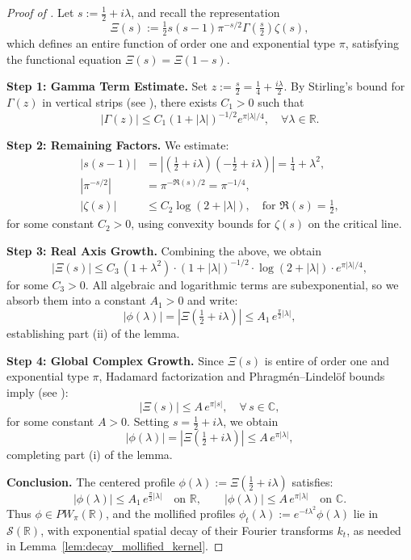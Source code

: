 \begin{proof}[Proof of ]
Let \( s := \tfrac{1}{2} + i\lambda \), and recall the representation
\[
\Xi(s) := \tfrac{1}{2}s(s-1)\pi^{-s/2} \Gamma\left( \tfrac{s}{2} \right) \zeta(s),
\]
which defines an entire function of order one and exponential type \( \pi \), satisfying the functional equation \( \Xi(s) = \Xi(1 - s) \).

\medskip
\noindent\textbf{Step 1: Gamma Term Estimate.}
Set \( z := \tfrac{s}{2} = \tfrac{1}{4} + \tfrac{i\lambda}{2} \). By Stirling’s bound for \( \Gamma(z) \) in vertical strips (see \cite[Eq.~(1.5.3)]{Titchmarsh1986Zeta}), there exists \( C_1 > 0 \) such that
\[
|\Gamma(z)| \le C_1 (1 + |\lambda|)^{-1/2} e^{\pi |\lambda| / 4}, \quad \forall \lambda \in \mathbb{R}.
\]

\medskip
\noindent\textbf{Step 2: Remaining Factors.}
We estimate:
\begin{align*}
|s(s - 1)| &= \left| \left( \tfrac{1}{2} + i\lambda \right)\left( -\tfrac{1}{2} + i\lambda \right) \right| = \tfrac{1}{4} + \lambda^2, \\
|\pi^{-s/2}| &= \pi^{-\Re(s)/2} = \pi^{-1/4}, \\
|\zeta(s)| &\le C_2 \log(2 + |\lambda|), \quad \text{for } \Re(s) = \tfrac{1}{2},
\end{align*}
for some constant \( C_2 > 0 \), using convexity bounds for \( \zeta(s) \) on the critical line.

\medskip
\noindent\textbf{Step 3: Real Axis Growth.}
Combining the above, we obtain
\[
|\Xi(s)| \le C_3\, (1 + \lambda^2) \cdot (1 + |\lambda|)^{-1/2} \cdot \log(2 + |\lambda|) \cdot e^{\pi |\lambda| / 4},
\]
for some \( C_3 > 0 \). All algebraic and logarithmic terms are subexponential, so we absorb them into a constant \( A_1 > 0 \) and write:
\[
|\phi(\lambda)| = |\Xi(\tfrac{1}{2} + i\lambda)| \le A_1\, e^{\tfrac{\pi}{2} |\lambda|},
\]
establishing part (ii) of the lemma.

\medskip
\noindent\textbf{Step 4: Global Complex Growth.}
Since \( \Xi(s) \) is entire of order one and exponential type \( \pi \), Hadamard factorization and Phragmén–Lindelöf bounds imply (see \cite[Ch.~3]{Levin1996EntireLectures}):
\[
|\Xi(s)| \le A\, e^{\pi |s|}, \quad \forall\, s \in \mathbb{C},
\]
for some constant \( A > 0 \). Setting \( s = \tfrac{1}{2} + i\lambda \), we obtain
\[
|\phi(\lambda)| = |\Xi(\tfrac{1}{2} + i\lambda)| \le A\, e^{\pi |\lambda|},
\]
completing part (i) of the lemma.

\medskip
\noindent\textbf{Conclusion.}
The centered profile \( \phi(\lambda) := \Xi(\tfrac{1}{2} + i\lambda) \) satisfies:
\[
|\phi(\lambda)| \le A_1\, e^{\frac{\pi}{2}|\lambda|} \quad \text{on } \mathbb{R}, \qquad |\phi(\lambda)| \le A\, e^{\pi|\lambda|} \quad \text{on } \mathbb{C}.
\]
Thus \( \phi \in PW_\pi(\mathbb{R}) \), and the mollified profiles \( \phi_t(\lambda) := e^{-t\lambda^2} \phi(\lambda) \) lie in \( \mathcal{S}(\mathbb{R}) \), with exponential spatial decay of their Fourier transforms \( k_t \), as needed in Lemma~\ref{lem:decay_mollified_kernel}.
\end{proof}
